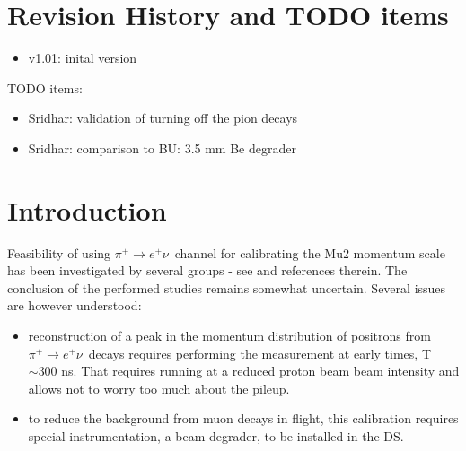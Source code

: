\documentclass[12pt]{article}
\newcommand {\red}       {\color{red}}
\newcommand {\piplusenu} {\mbox{$\pi^+ \to e^+ \nu$}}
\begin{document}
% 


\newpage
\section {Revision History and TODO items}

\begin{itemize}
\item
  v1.01: inital version
\end{itemize}

TODO items:

\begin{itemize}
\item
  {\red Sridhar: validation of turning off the pion decays}
\item
  {\red Sridhar: comparison to BU: 3.5 mm Be degrader}
\end{itemize}

\newpage
\section {Introduction}

Feasibility of using \piplusenu\ channel for calibrating the Mu2 momentum scale has been investigated
by several groups - see \cite{MU2E_5391_PIPLUSENU, MU2E_48165_PIPLUSENU} and references therein.
%
The conclusion of the performed studies remains somewhat uncertain. Several issues
are however understood:
\begin{itemize}
\item 
  reconstruction of a peak in the momentum distribution of positrons from \piplusenu\ decays
  requires performing the measurement at early times, T $\sim 300$ ns.
  That requires running at a reduced proton beam beam intensity and allows not to worry
  too much about the pileup.
\item
  to reduce the background from muon decays in flight, this calibration requires 
  special instrumentation, a beam degrader, to be installed in the DS.
\end{itemize}
\end{document}

